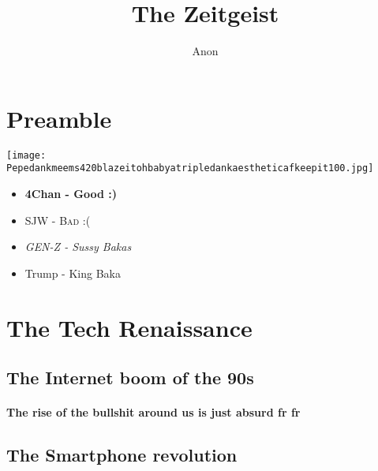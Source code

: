 \documentclass[a4paper,12pt]{article}
\begin{document}
	\title{The Zeitgeist}
	\author{Anon}
	\maketitle
	\tableofcontents
	\newpage
	\section{Preamble}
		\texttt{[image: Pepedankmeems420blazeitohbabyatripledankaestheticafkeepit100.jpg]}
	\begin{itemize}
		\item \textbf{4Chan - Good :)}
		\item \textsc{SJW - Bad :(}
		\item \textit{GEN-Z - Sussy Bakas}
		\item Trump - King Baka
	\end{itemize}
	\section{The Tech Renaissance}
	\subsection{The Internet boom of the 90s}
	\paragraph{The rise of the bullshit around us is just absurd fr fr }
	\subsection{The Smartphone revolution}
\end{document}
